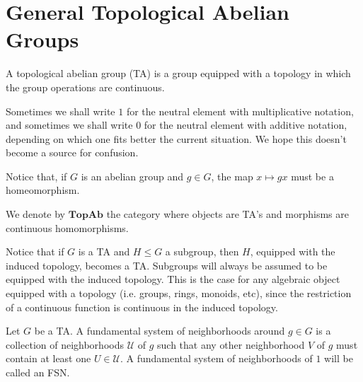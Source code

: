 \section{General Topological Abelian Groups}

\begin{definition} A topological abelian group (TA) is a group equipped with a topology in which the group operations are continuous.
\end{definition}

\begin{remark} Sometimes we shall write $1$ for the neutral element with multiplicative notation, and sometimes we shall write $0$ for the neutral element with additive notation, depending on which one fits better the current situation. We hope this doesn't become a source for confusion.
\end{remark}

\begin{remark}
Notice that, if $G$ is an abelian group and $g \in G$, the map $x \mapsto gx$ must be a homeomorphism.
\end{remark}

\noindent We denote by $\textbf{TopAb}$ the category where objects are TA's and morphisms are continuous homomorphisms.

\begin{remark} Notice that if $G$ is a TA and $H \leq G$ a subgroup, then $H$, equipped with the induced topology, becomes a TA. Subgroups will always be assumed to be equipped with the induced topology. This is the case for any algebraic object equipped with a topology (i.e. groups, rings, monoids, etc), since the restriction of a continuous function is continuous in the induced topology.
\end{remark}


\begin{definition} Let $G$ be a TA. A fundamental system of neighborhoods around $g \in G$ is a collection of neighborhoods $\mathcal{U}$ of $g$ such that any other neighborhood $V$ of $g$ must contain at least one $U \in \mathcal{U}$. A fundamental system of neighborhoods of $1$ will be called an FSN.
\end{definition}

